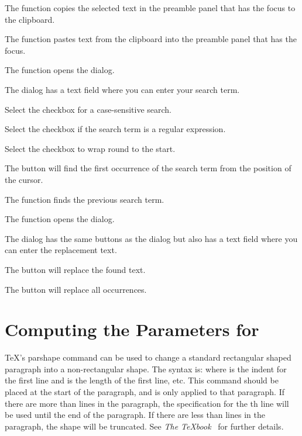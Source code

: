 %
The  function copies the selected text in the
preamble panel that has the focus to the clipboard.

%
The  function pastes text from the
clipboard into the preamble panel that has the focus.

%
The  function opens the 
dialog.

%
The  dialog has a text field where you can enter your
search term. 

%
Select the  checkbox for a case-sensitive search.

%
Select the  checkbox if the search term is a
regular expression.

%
Select the  checkbox to wrap round to the start.

%
The  button will find the first occurrence of the
search term from the position of the cursor.

%
The  function finds the previous
search term.

%
The  function opens the
 dialog.

%
The  dialog has the same buttons as the
 dialog but also has a text field where you can enter
the replacement text.

%
The  button will replace the found text.

%
The  button will replace all occurrences.


\section{Computing the Parameters for }\label{sec:parshape}


\TeX's \gls{parshape} command can be used to change a
standard rectangular shaped paragraph into a non-rectangular
shape. The syntax is:
where  is the indent for
the first line and  is
the length of the first line, etc.  This command should be placed at
the start of the paragraph, and is only applied to that paragraph.
If there are more than  lines in the
paragraph, the specification for the th
line will be used until the end of the paragraph. If there are less
than  lines in the paragraph, the shape
will be truncated. See \emph{The \TeX{}book}~\cite{Knuth} for further
details.

